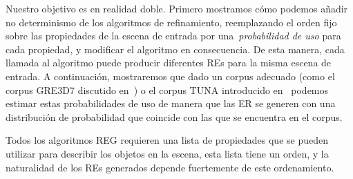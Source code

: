 Nuestro objetivo es en realidad doble. Primero mostramos c\'omo podemos a\~nadir no determinismo de los algoritmos de refinamiento, reemplazando el orden fijo
sobre las propiedades de la escena de entrada por una~\emph{probabilidad de uso} para cada propiedad, y modificar el algoritmo en consecuencia.
De esta manera, cada llamada al algoritmo puede producir diferentes REs para la misma escena de entrada. A continuaci\'on, mostraremos que dado un corpus adecuado (como el corpus GRE3D7 discutido en~\cite{viet:gene11}) o el corpus TUNA introducido en~\cite{gatt-balz-kow:2008:ENLG} podemos estimar estas probabilidades de uso de manera que las ER se generen con una distribuci\'on de probabilidad que coincide con las que se encuentra en el corpus.

Todos los algoritmos REG requieren una lista de propiedades que se pueden utilizar para describir los objetos en la escena, esta lista tiene un orden, y la naturalidad de los REs generados depende fuertemente de este ordenamiento.




